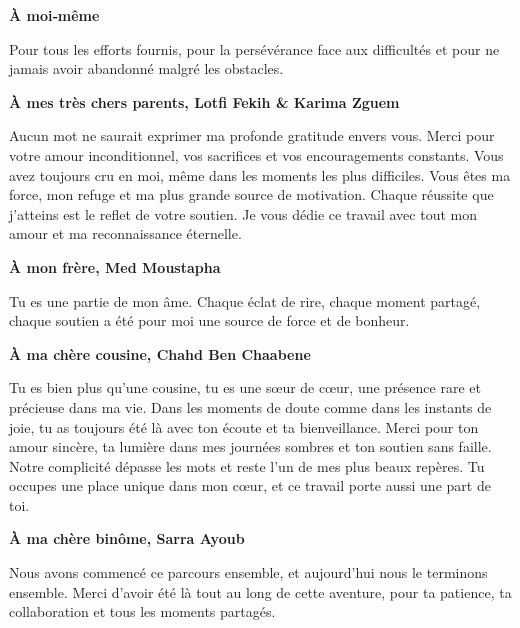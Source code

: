 {\centering
\textbf{\large À moi‑même}\par
}

Pour tous les efforts fournis, pour la persévérance face aux difficultés et pour ne jamais avoir abandonné malgré les obstacles.

\vspace{0.3cm}

{\centering
\textbf{\large À mes très chers parents, Lotfi Fekih \& Karima Zguem}\par
}

Aucun mot ne saurait exprimer ma profonde gratitude envers vous.  
Merci pour votre amour inconditionnel, vos sacrifices et vos encouragements constants.  
Vous avez toujours cru en moi, même dans les moments les plus difficiles.  
Vous êtes ma force, mon refuge et ma plus grande source de motivation.  
Chaque réussite que j’atteins est le reflet de votre soutien.  
Je vous dédie ce travail avec tout mon amour et ma reconnaissance éternelle.  
\vspace{0.3cm}

{\centering
\textbf{\large À mon frère, Med Moustapha}\par
}

Tu es une partie de mon âme. Chaque éclat de rire, chaque moment partagé, chaque soutien a été pour moi une source de force et de bonheur.

\vspace{0.3cm}

{\centering
\textbf{\large À ma chère cousine, Chahd Ben Chaabene}\par
}

Tu es bien plus qu’une cousine, tu es une sœur de cœur, une présence rare et précieuse dans ma vie.  
Dans les moments de doute comme dans les instants de joie, tu as toujours été là avec ton écoute et ta bienveillance.  
Merci pour ton amour sincère, ta lumière dans mes journées sombres et ton soutien sans faille.  
Notre complicité dépasse les mots et reste l’un de mes plus beaux repères.  
Tu occupes une place unique dans mon cœur, et ce travail porte aussi une part de toi.  
\vspace{0.3cm}

{\centering
\textbf{\large À ma chère binôme, Sarra Ayoub}\par
}

Nous avons commencé ce parcours ensemble, et aujourd’hui nous le terminons ensemble. Merci d’avoir été là tout au long de cette aventure, pour ta patience, ta collaboration et tous les moments partagés.

